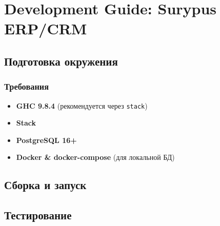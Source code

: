 \chapter{Development Guide: Surypus
ERP/CRM}\label{development-guide-surypus-erpcrm}

\section{Подготовка
окружения}\label{ux43fux43eux434ux433ux43eux442ux43eux432ux43aux430-ux43eux43aux440ux443ux436ux435ux43dux438ux44f}

\subsection{Требования}\label{ux442ux440ux435ux431ux43eux432ux430ux43dux438ux44f}

\begin{itemize}
\tightlist
\item
  \textbf{GHC 9.8.4} (рекомендуется через \texttt{stack})
\item
  \textbf{Stack}
\item
  \textbf{PostgreSQL 16+}
\item
  \textbf{Docker \& docker-compose} (для локальной БД)
\end{itemize}

\section{Сборка и
запуск}\label{ux441ux431ux43eux440ux43aux430-ux438-ux437ux430ux43fux443ux441ux43a}

\begin{Shaded}
\begin{Highlighting}[]


\end{Highlighting}
\end{Shaded}

\section{Тестирование}\label{ux442ux435ux441ux442ux438ux440ux43eux432ux430ux43dux438ux435}

